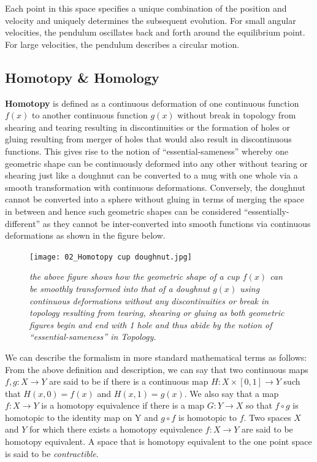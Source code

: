 Each point in this space specifies a unique combination of the position and velocity and uniquely determines the subsequent evolution. For small angular velocities, the pendulum oscillates back and forth around the equilibrium point. For large velocities, the pendulum describes a circular motion.

\subsection{Homotopy \& Homology}

\textbf{Homotopy} \cite{03.1_2009simplicialHomotopy} \cite{08.1_2003SimplicialHomology} is defined as  a continuous deformation of one continuous function $f(x)$ to another continuous function $g(x)$ without break in topology from shearing and  tearing resulting in discontinuities or the formation of holes or gluing resulting from merger of holes that would also result in discontinuous functions. This gives rise to the notion of “essential-sameness” whereby one geometric shape can be continuously deformed into any other without tearing or shearing just like a doughnut can be converted to a mug with one whole via a smooth transformation with continuous deformations. Conversely, the doughnut cannot be converted into a sphere without gluing in terms of merging the space in between and hence such geometric shapes can be considered “essentially-different” as they cannot be inter-converted into smooth functions via continuous deformations as shown in the figure below.\cite{07_bjorner2003Homotopy}

\begin{figure}[H]
	\centering
	\texttt{[image: 02\_Homotopy cup doughnut.jpg]}
	\caption{\textit{the above figure shows how the geometric shape of a cup $f(x)$ can be smoothly transformed into that of a doughnut $g(x)$ using continuous deformations without any discontinuities or break in topology resulting from tearing, shearing or gluing as both geometric figures begin and end with 1 hole and thus abide by the notion of “essential-sameness” in Topology. }}
	\label{fig:Homotopy}
\end{figure}

We can describe the formalism in more standard mathematical terms as follows: From the above definition and description, we can say that two continuous maps $f, g : X \rightarrow Y$ are said to be  if there is a continuous map  $H :X \times [0, 1] \rightarrow Y$ such that $H(x, 0) = f(x)$ and $H(x, 1) = g(x)$. We also say that a map $f : X \rightarrow Y$ is a homotopy equivalence if there is a map $G : Y \rightarrow X$ so that $f \circ g$ is homotopic to the identity map on Y and $g \circ f$ is homotopic to $f$. Two spaces $X$ and $Y$ for which there exists a homotopy equivalence $f : X \rightarrow Y$ are said to be homotopy equivalent. A space that is homotopy equivalent to the one point space is said to be \textit{contractible}. \cite{07.1_Homotopy} \cite{07_bjorner2003Homotopy}

